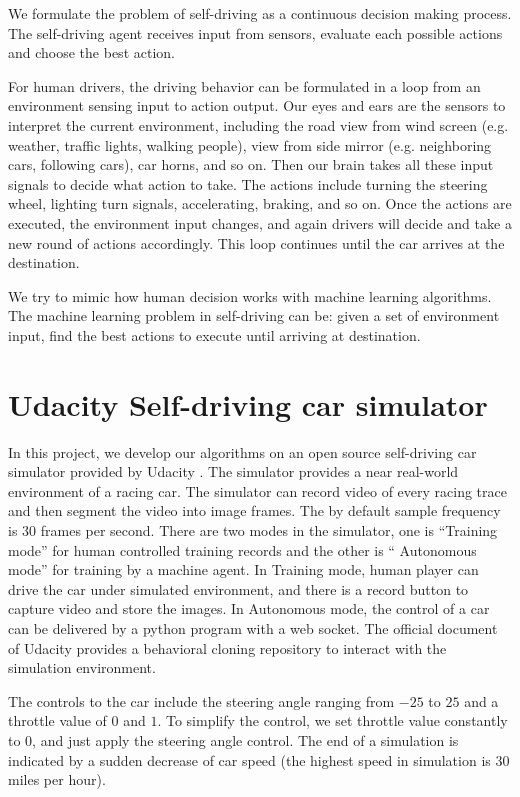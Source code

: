\documentclass[a4paper]{article}
\begin{document}
We formulate the problem of self-driving as a continuous decision making process. The
self-driving agent receives input from sensors, evaluate each possible actions and choose
the best action.

For human drivers, the driving behavior can be formulated in a loop from an environment sensing
input to action output. Our eyes and ears are the sensors to interpret the current environment,
including the road view from wind screen (e.g. weather, traffic lights, walking people), view
from side mirror (e.g. neighboring cars, following cars), car horns, and so on. Then our brain
takes all these input signals to decide what action to take. The actions include turning the
steering wheel, lighting turn signals, accelerating, braking, and so on. Once the actions are
executed, the environment input changes, and again drivers will decide and take a new round of
actions accordingly. This loop continues until the car arrives at the destination. 

We try to mimic how human decision works with machine learning algorithms. The machine learning
problem in self-driving can be: given a set of environment input, find the best actions to
execute until arriving at destination.


\section{Udacity Self-driving car simulator }

In this project, we develop our algorithms on an open source self-driving car simulator provided
by Udacity \cite{simulator}. The simulator provides a near real-world environment of a racing 
car. The simulator can record video of every racing trace and then segment the video into image
frames. The by default sample frequency is 30 frames per second. There are two modes in the 
simulator, one is ``Training mode'' for human controlled training records and the other is ``
Autonomous mode'' for training by a machine agent. In Training mode, human player can drive the
car under simulated environment, and there is a record button to capture video and store the images.
In Autonomous mode, the control of a car can be delivered by a python program with a web socket.
The official document of Udacity provides a behavioral cloning repository \cite{behavior} to interact
with the simulation environment. 

The controls to the car include the steering angle ranging from $-25$ to $25$ and a throttle value
of $0$ and $1$. To simplify the control, we set throttle value constantly to $0$, and just apply the
steering angle control. The end of a simulation is indicated by a sudden decrease of car speed (the
highest speed in simulation is 30 miles per hour).
\end{document}
